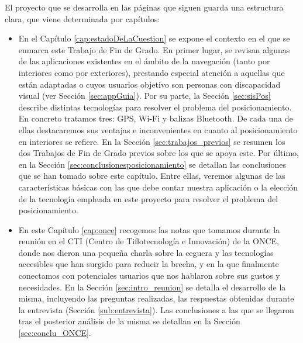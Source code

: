 El proyecto que se desarrolla en las páginas que siguen guarda una estructura clara, que viene determinada por capítulos:

\begin{itemize}
	\item En el Capítulo \ref{cap:estadoDeLaCuestion} se expone el contexto en el que se enmarca este Trabajo de Fin de Grado. En primer lugar, se revisan algunas de las aplicaciones existentes en el ámbito de la navegación (tanto por interiores como por exteriores), prestando especial atención a aquellas que están adaptadas o cuyos usuarios objetivo son personas con discapacidad visual (ver Sección \ref{sec:appGuia}). Por su parte, la Sección \ref{sec:sisPos} describe distintas tecnologías para resolver el problema del posicionamiento. En concreto tratamos tres: GPS, Wi-Fi y balizas Bluetooth. De cada una de ellas destacaremos sus ventajas e inconvenientes en cuanto al posicionamiento en interiores se refiere. En la Sección \ref{sec:trabajos_previos} se resumen los dos Trabajos de Fin de Grado previos sobre los que se apoya este. Por último, en la Sección \ref{sec:conclusionesposicionamiento} se detallan las conclusiones que se han tomado sobre este capítulo. Entre ellas, veremos algunas de las características básicas con las que debe contar nuestra aplicación o la elección de la tecnología empleada en este proyecto para resolver el problema del posicionamiento. 
	
	\item En este Capítulo \ref{cap:once} recogemos las notas que tomamos durante la reunión en el CTI (Centro de Tiflotecnología e Innovación) de la ONCE, donde nos dieron una pequeña charla sobre la ceguera y las tecnologías accesibles que han surgido para reducir la brecha, y en la que finalmente conectamos con potenciales usuarios que nos hablaron sobre sus gustos y necesidades. En la Sección \ref{sec:intro_reunion} se detalla el desarrollo de la misma, incluyendo las preguntas realizadas, las respuestas obtenidas durante la entrevista (Sección \ref{sub:entrevista}). Las conclusiones a las que se llegaron tras el posterior análisis de la misma se detallan en la Sección \ref{sec:conclu_ONCE}.
	

\end{itemize}
